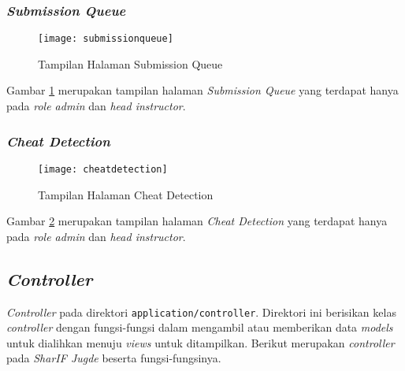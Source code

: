 \subsubsection{\textit{Submission Queue}}
\begin{figure}[H]
	\centering  
	\texttt{[image: submissionqueue]}  
	\caption[Tampilan Halaman \textit{Submission Queue}]{Tampilan Halaman Submission Queue} 
	\label{fig:submissionqueue} 
\end{figure}

Gambar \ref{fig:submissionqueue} merupakan tampilan halaman \textit{Submission Queue} yang terdapat hanya pada \textit{role admin} dan \textit{head instructor}.

\subsubsection{\textit{Cheat Detection}}
\begin{figure}[H]
	\centering  
	\texttt{[image: cheatdetection]}  
	\caption[Tampilan Halaman \textit{Cheat Detection}]{Tampilan Halaman Cheat Detection} 
	\label{fig:cheatdetection} 
\end{figure}

Gambar \ref{fig:cheatdetection} merupakan tampilan halaman \textit{Cheat Detection} yang terdapat hanya pada \textit{role admin} dan \textit{head instructor}.

\subsection{\textit{Controller}}
\textit{Controller} pada direktori \texttt{application/controller}. Direktori ini berisikan kelas \textit{controller} dengan fungsi-fungsi dalam mengambil atau memberikan data \textit{models} untuk dialihkan menuju \textit{views} untuk ditampilkan. Berikut merupakan \textit{controller} pada \textit{SharIF Jugde} beserta fungsi-fungsinya.
